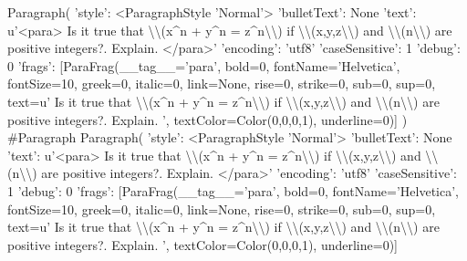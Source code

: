 \documentclass{article}%
\begin{document}
%
\normalsize%
Paragraph(\newline%
'style': <ParagraphStyle 'Normal'>\newline%
'bulletText': None\newline%
'text': u'<para> Is it true that \textbackslash{}\textbackslash{}(x\^{}n + y\^{}n = z\^{}n\textbackslash{}\textbackslash{}) if \textbackslash{}\textbackslash{}(x,y,z\textbackslash{}\textbackslash{}) and \textbackslash{}\textbackslash{}(n\textbackslash{}\textbackslash{}) are positive integers?. Explain. </para>'\newline%
'encoding': 'utf8'\newline%
'caseSensitive': 1\newline%
'debug': 0\newline%
'frags': {[}ParaFrag(\_\_tag\_\_='para', bold=0, fontName='Helvetica', fontSize=10, greek=0, italic=0, link=None, rise=0, strike=0, sub=0, sup=0, text=u' Is it true that \textbackslash{}\textbackslash{}(x\^{}n + y\^{}n = z\^{}n\textbackslash{}\textbackslash{}) if \textbackslash{}\textbackslash{}(x,y,z\textbackslash{}\textbackslash{}) and \textbackslash{}\textbackslash{}(n\textbackslash{}\textbackslash{}) are positive integers?. Explain. ', textColor=Color(0,0,0,1), underline=0){]}\newline%
) \#Paragraph%
Paragraph(\newline%
'style': <ParagraphStyle 'Normal'>\newline%
'bulletText': None\newline%
'text': u'<para> Is it true that \textbackslash{}\textbackslash{}(x\^{}n + y\^{}n = z\^{}n\textbackslash{}\textbackslash{}) if \textbackslash{}\textbackslash{}(x,y,z\textbackslash{}\textbackslash{}) and \textbackslash{}\textbackslash{}(n\textbackslash{}\textbackslash{}) are positive integers?. Explain. </para>'\newline%
'encoding': 'utf8'\newline%
'caseSensitive': 1\newline%
'debug': 0\newline%
'frags': {[}ParaFrag(\_\_tag\_\_='para', bold=0, fontName='Helvetica', fontSize=10, greek=0, italic=0, link=None, rise=0, strike=0, sub=0, sup=0, text=u' Is it true that \textbackslash{}\textbackslash{}(x\^{}n + y\^{}n = z\^{}n\textbackslash{}\textbackslash{}) if \textbackslash{}\textbackslash{}(x,y,z\textbackslash{}\textbackslash{}) and \textbackslash{}\textbackslash{}(n\textbackslash{}\textbackslash{}) are positive integers?. Explain. ', textColor=Color(0,0,0,1), underline=0){]}\newline%
\end{document}
